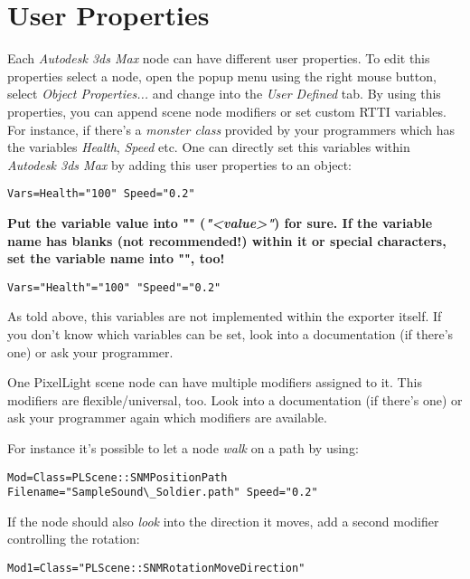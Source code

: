 \chapter{User Properties}
Each \emph{Autodesk 3ds Max} node can have different user properties. To edit this properties select a node, open the popup menu using the right mouse button, select \emph{Object Properties...} and change into the \emph{User Defined} tab. By using this properties, you can append scene node modifiers or set custom \ac{RTTI} variables. For instance, if there's a \emph{monster class} provided by your programmers which has the variables \emph{Health}, \emph{Speed} etc. One can directly set this variables within \emph{Autodesk 3ds Max} by adding this user properties to an object:

\begin{lstlisting}[caption=Setting scene node variables]
Vars=Health="100" Speed="0.2"
\end{lstlisting}

\textbf{Put the variable value into "" (\emph{"<value>"}) for sure. If the variable name has blanks (not recommended!) within it or special characters, set the variable name into "", too!}

\begin{lstlisting}[caption=Setting scene node variables safely]
Vars="Health"="100" "Speed"="0.2"
\end{lstlisting}

As told above, this variables are not implemented within the exporter itself. If you don't know which variables can be set, look into a documentation (if there's one) or ask your programmer.

One PixelLight scene node can have multiple modifiers assigned to it. This modifiers are flexible/universal, too. Look into a documentation (if there's one) or ask your programmer again which modifiers are available.

For instance it's possible to let a node \emph{walk} on a path by using:

\begin{lstlisting}[caption=Path scene node modifier]
Mod=Class=PLScene::SNMPositionPath Filename="SampleSound\_Soldier.path" Speed="0.2"
\end{lstlisting}

If the node should also \emph{look} into the direction it moves, add a second modifier controlling the rotation:

\begin{lstlisting}[caption=Look into movement direction scene node modifier]
Mod1=Class="PLScene::SNMRotationMoveDirection"
\end{lstlisting}

